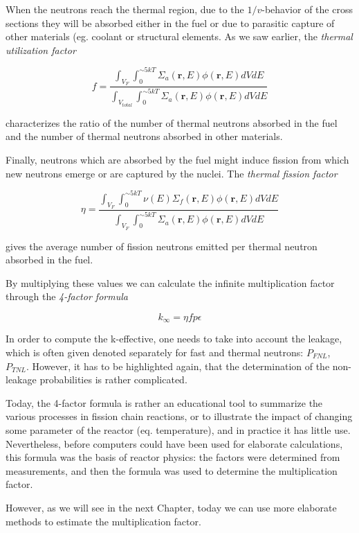 When the neutrons reach the thermal region, due to the $1/v$-behavior of the cross sections they will be absorbed either in the fuel or due to parasitic capture of other materials (eg. coolant or structural elements. As we saw earlier, the \textit{thermal utilization factor}

$$f=\frac{\int_{V_{F}} \int_0^{\sim 5kT} \Sigma_a(\mathbf{r},E)\phi(\mathbf{r},E)dVdE}{\int_{V_{total}} \int_0^{\sim 5kT} \Sigma_a(\mathbf{r},E)\phi(\mathbf{r},E)dVdE}$$

characterizes the ratio of the number of thermal neutrons absorbed in the fuel and the number of thermal neutrons absorbed in other materials.

Finally, neutrons which are absorbed by the fuel might induce fission from which new neutrons emerge or are captured by the nuclei. The \textit{thermal fission factor}

$$\eta=\frac{\int_{V_{F}} \int_0^{\sim 5kT} \nu(E)\Sigma_f(\mathbf{r},E)\phi(\mathbf{r},E)dVdE}{\int_{V_{F}} \int_0^{\sim 5kT} \Sigma_a(\mathbf{r},E)\phi(\mathbf{r},E)dVdE}$$

gives the average number of fission neutrons emitted per thermal neutron absorbed in the fuel.

By multiplying these values we can calculate the infinite multiplication factor through the \textit{4-factor formula}

$$k_{\infty}=\eta f p \epsilon$$

In order to compute the k-effective, one needs to take into account the leakage, which is often given denoted separately for fast and thermal neutrons: $P_{FNL}$, $P_{TNL}$. However, it has to be highlighted again, that the determination of the non-leakage probabilities is rather complicated.

Today, the 4-factor formula is rather an educational tool to summarize the various processes in fission chain reactions, or to illustrate the impact of changing some parameter of the reactor (eq. temperature), and in practice it has little use. Nevertheless, before computers could have been used for elaborate calculations, this formula was the basis of reactor physics: the factors were determined from measurements, and then the formula was used to determine the multiplication factor.

However, as we will see in the next Chapter, today we can use more elaborate methods to estimate the multiplication factor.

%